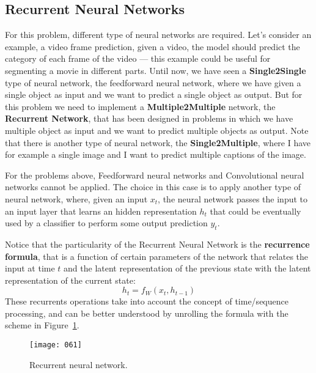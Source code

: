 \subsection{Recurrent Neural Networks}
For this problem, different type of neural networks are required. Let's consider an example, a video frame prediction, given a video, the model should predict the category of each frame of the video --- this example could be useful for segmenting a movie in different parts. Until now, we have seen a \textbf{Single2Single} type of neural network, the feedforward neural network, where we have given a single object as input and we want to predict a single object as output. But for this problem we need to implement a \textbf{Multiple2Multiple} network, the \textbf{Recurrent Network}, that has been designed in problems in which we have multiple object as input and we want to predict multiple objects as output. Note that there is another type of neural network, the \textbf{Single2Multiple}, where I have for example a single image and I want to predict multiple captions of the image.

For the problems above, Feedforward neural networks and Convolutional neural networks cannot be applied. The choice in this case is to apply another type of neural network, where, given an input \(x_t\), the neural network passes the input to an input layer that learns an hidden representation \(h_t\) that could be eventually used by a classifier to perform some output prediction \(y_t\).

Notice that the particularity of the Recurrent Neural Network is the \textbf{recurrence formula}, that is a function of certain parameters of the network that relates the input at time \(t\) and the latent representation of the previous state with the latent representation of the current state:
\begin{equation}
    h_t = f_W(x_t, h_{t-1})
\end{equation}
These recurrents operations take into account the concept of time/sequence processing, and can be better understood by unrolling the formula with the scheme in Figure~\ref{fig:061}. 
\begin{figure}[h!]
    \centering
    \texttt{[image: 061]}
    \caption{Recurrent neural network.}
    \label{fig:061}
\end{figure}

